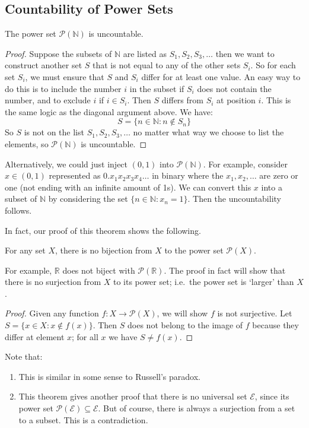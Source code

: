 \subsection{Countability of Power Sets}
\begin{theorem}
	The power set \(\mathcal P(\mathbb N)\) is uncountable.
\end{theorem}
\begin{proof}
	Suppose the subsets of \(\mathbb N\) are listed as \(S_1, S_2, S_3, \dots\) then we want to construct another set \(S\) that is not equal to any of the other sets \(S_i\). So for each set \(S_i\), we must ensure that \(S\) and \(S_i\) differ for at least one value. An easy way to do this is to include the number \(i\) in the subset if \(S_i\) does not contain the number, and to exclude \(i\) if \(i \in S_i\). Then \(S\) differs from \(S_i\) at position \(i\). This is the same logic as the diagonal argument above. We have:
	\[ S = \{ n \in \mathbb N : n \notin S_n \} \]
	So \(S\) is not on the list \(S_1, S_2, S_3, \dots\) no matter what way we choose to list the elements, so \(\mathcal P(\mathbb N)\) is uncountable.
\end{proof}
\begin{remark}
	Alternatively, we could just inject \((0, 1)\) into \(\mathcal P(\mathbb N)\). For example, consider \(x \in (0, 1)\) represented as \(0.x_1x_2x_3x_4\dots\) in binary where the \(x_1, x_2, \dots\) are zero or one (not ending with an infinite amount of 1s). We can convert this \(x\) into a subset of \(\mathbb N\) by considering the set \(\{ n \in \mathbb N : x_n = 1 \}\). Then the uncountability follows.
\end{remark}
In fact, our proof of this theorem shows the following.
\begin{theorem}
	For any set \(X\), there is no bijection from \(X\) to the power set \(\mathcal P(X)\).
\end{theorem}
For example, \(\mathbb R\) does not biject with \(\mathcal P(\mathbb R)\). The proof in fact will show that there is no surjection from \(X\) to its power set; i.e.\ the power set is `larger' than \(X\).
\begin{proof}
	Given any function \(f\colon X \to \mathcal P(X)\), we will show \(f\) is not surjective. Let \(S = \{ x \in X: x \notin f(x) \}\). Then \(S\) does not belong to the image of \(f\) because they differ at element \(x\); for all \(x\) we have \(S \neq f(x)\).
\end{proof}
\begin{remark}
	Note that:
	\begin{enumerate}
		\item This is similar in some sense to Russell's paradox.
		\item This theorem gives another proof that there is no universal set \(\mathscr E\), since its power set \(\mathcal P(\mathscr E) \subseteq \mathscr E\). But of course, there is always a surjection from a set to a subset. This is a contradiction.
	\end{enumerate}
\end{remark}

